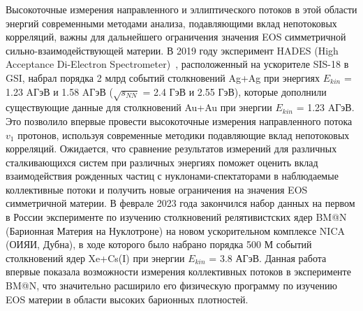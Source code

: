 Высокоточные измерения направленного и эллиптического потоков в этой области энергий современными методами анализа, подавляющими вклад непотоковых корреляций, важны для дальнейшего ограничения значения EOS симметричной сильно-взаимодействующей материи.
В 2019 году эксперимент HADES (High Acceptance Di-Electron Spectrometer)~\cite{HADES:2009aat}, расположенный на ускорителе SIS-18 в GSI, набрал порядка 2 млрд событий столкновений Ag+Ag при энергиях $E_{kin}$ = 1.23 AГэВ и 1.58 AГэВ ($\sqrt{s_{NN}}$ = 2.4 ГэВ и 2.55 ГэВ), которые дополнили существующие данные для столкновений Au+Au при энергии  $E_{kin}$ = 1.23 AГэВ. 
Это позволило впервые провести высокоточные измерения направленного потока $v_1$ протонов, используя современные методики подавляющие вклад непотоковых корреляций.
Ожидается, что сравнение результатов измерений для различных сталкивающихся систем при различных энергиях поможет  оценить вклад взаимодействия рожденных частиц с нуклонами-спектаторами в наблюдаемые коллективные  потоки и получить новые ограничения на значения EOS симметричной материи.
В феврале 2023 года закончился набор данных на первом в России эксперименте по изучению столкновений релятивистских ядер BM@N (Барионная Материя на Нуклотроне) на новом ускорительном комплексе NICA (ОИЯИ, Дубна), в ходе которого было набрано порядка 500 М событий столкновений ядер Xe+Cs(I) при энергии  $E_{kin}$ = 3.8 АГэВ. Данная работа впервые показала возможности измерения коллективных потоков
в эксперименте BM@N,  что значительно расширило его физическую программу по изучению EOS материи  в области высоких барионных плотностей.

